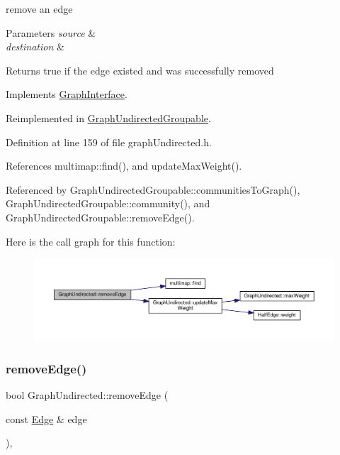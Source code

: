 remove an edge


\begin{DoxyParams}{Parameters}
{\em source} & \\
\hline
{\em destination} & \\
\hline
\end{DoxyParams}
\begin{DoxyReturn}{Returns}
true if the edge existed and was successfully removed 
\end{DoxyReturn}


Implements \hyperlink{classGraphInterface_a1297fd6d7c9698197b5f570f2a9f3701}{Graph\+Interface}.



Reimplemented in \hyperlink{classGraphUndirectedGroupable_ad1a488cc292d7e63d289f598aeaaacd6}{Graph\+Undirected\+Groupable}.



Definition at line 159 of file graph\+Undirected.\+h.



References multimap\+::find(), and update\+Max\+Weight().



Referenced by Graph\+Undirected\+Groupable\+::communities\+To\+Graph(), Graph\+Undirected\+Groupable\+::community(), and Graph\+Undirected\+Groupable\+::remove\+Edge().

Here is the call graph for this function\+:\nopagebreak
\begin{figure}[H]
\begin{center}
\leavevmode
\includegraphics[width=350pt]{classGraphUndirected_af4a40541132a66c9b688a20958057751_cgraph}
\end{center}
\end{figure}
\mbox{\label{classGraphUndirected_ad39275e7a8f7a39734916b8c5400a1d6}} 
\subsubsection{\texorpdfstring{remove\+Edge()}{removeEdge()}\hspace{0.1cm}{\footnotesize\ttfamily [2/2]}}
{\footnotesize\ttfamily bool Graph\+Undirected\+::remove\+Edge (\begin{DoxyParamCaption}\item[{const \hyperlink{classEdge}{Edge} \&}]{edge }\end{DoxyParamCaption})\hspace{0.3cm}{\ttfamily [inline]}, {\ttfamily [virtual]}}

